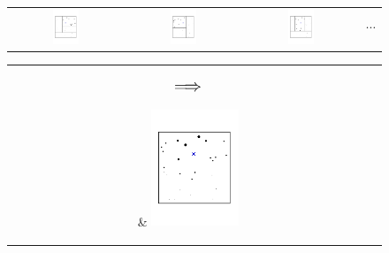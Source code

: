\documentclass[aos]{imsart}
\theoremstyle{plain}
\theoremstyle{definition}
\theoremstyle{remark}
\begin{document}
\begin{CJK}{UTF8}{gbsn}
\begin{figure}
\begin{center}
\begin{tabular}{cccc}
\includegraphics[width = 0.25\textwidth, trim=15mm 40mm 20mm 40mm, clip = TRUE]{tree_match1.pdf} &
\includegraphics[width = 0.25\textwidth, trim=15mm 40mm 20mm 40mm, clip = TRUE]{tree_match2.pdf} &
\includegraphics[width = 0.25\textwidth, trim=15mm 40mm 20mm 40mm, clip = TRUE]{tree_match3.pdf} &
\parbox[b][0.25\textwidth][c]{0.1\textwidth}{$$\cdots$$}
\end{tabular}
\vspace{-\baselineskip}
\begin{tabular}{cc}
\parbox[b][0.25\textwidth][c]{0.12\textwidth}{$$\mathlarger{\mathlarger{\Longrightarrow}}$$} &
\includegraphics[width = 0.25\textwidth, trim=15mm 40mm 20mm 40mm, clip = TRUE]{tree_match_ensemble.pdf}

\end{tabular}
\end{center}
\end{figure}
\end{CJK}
\end{document}
